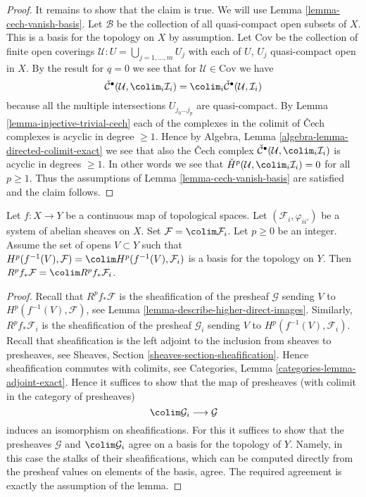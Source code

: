 \begin{proof}
\medskip\noindent
It remains to show that the claim is true. We will use
Lemma \ref{lemma-cech-vanish-basis}.
Let $\mathcal{B}$ be the collection of all quasi-compact open
subsets of $X$. This is a basis for the topology on $X$ by assumption.
Let $\text{Cov}$ be the collection of finite open coverings
$\mathcal{U} : U = \bigcup_{j = 1, \ldots, m} U_j$ with each
of $U$, $U_j$ quasi-compact open in $X$. By the result for $q = 0$
we see that for $\mathcal{U} \in \text{Cov}$ we have
$$
\check{\mathcal{C}}^\bullet(\mathcal{U}, \colim_i \mathcal{I}_i)
=
\colim_i \check{\mathcal{C}}^\bullet(\mathcal{U}, \mathcal{I}_i)
$$
because all the multiple intersections $U_{j_0 \ldots j_p}$
are quasi-compact. By Lemma \ref{lemma-injective-trivial-cech}
each of the complexes in the colimit of {\v C}ech complexes is
acyclic in degree $\geq 1$. Hence by
Algebra, Lemma \ref{algebra-lemma-directed-colimit-exact}
we see that also the {\v C}ech complex
$\check{\mathcal{C}}^\bullet(\mathcal{U}, \colim_i \mathcal{I}_i)$
is acyclic in degrees $\geq 1$. In other words we see that
$\check{H}^p(\mathcal{U},  \colim_i \mathcal{I}_i) = 0$
for all $p \geq 1$. Thus the assumptions of
Lemma \ref{lemma-cech-vanish-basis} are satisfied and the claim follows.
\end{proof}

\begin{lemma}
\label{lemma-higher-direct-image-colimit}
Let $f : X \to Y$ be a continuous map of topological spaces.
Let $(\mathcal{F}_i, \varphi_{ii'})$ be a system of
abelian sheaves on $X$. Set $\mathcal{F} = \colim \mathcal{F}_i$.
Let $p \geq 0$ be an integer. Assume the set of opens $V \subset Y$ such that
$H^p(f^{-1}(V), \mathcal{F}) = \colim H^p(f^{-1}(V), \mathcal{F}_i)$
is a basis for the topology on $Y$. Then
$R^pf_*\mathcal{F} = \colim R^pf_*\mathcal{F}_i$.
\end{lemma}

\begin{proof}
Recall that $R^pf_*\mathcal{F}$ is the sheafification of the presheaf
$\mathcal{G}$ sending $V$ to $H^p(f^{-1}(V), \mathcal{F})$, see
Lemma \ref{lemma-describe-higher-direct-images}. Similarly, 
$R^pf_*\mathcal{F}_i$ is the sheafification of the presheaf
$\mathcal{G}_i$ sending $V$ to $H^p(f^{-1}(V), \mathcal{F}_i)$.
Recall that sheafification is the left adjoint to the inclusion
from sheaves to presheaves, see Sheaves, Section
\ref{sheaves-section-sheafification}. Hence sheafification commutes
with colimits, see Categories, Lemma \ref{categories-lemma-adjoint-exact}.
Hence it suffices to show that the map of presheaves (with colimit
in the category of presheaves)
$$
\colim \mathcal{G}_i \longrightarrow \mathcal{G}
$$
induces an isomorphism on sheafifications. For this it suffices to show
that the presheaves $\mathcal{G}$ and $\colim \mathcal{G}_i$
agree on a basis for the topology of $Y$. Namely, in this case the stalks
of their sheafifications, which can be computed directly from the
presheaf values on elements of the basis, agree.
The required agreement is exactly the assumption of the lemma.
\end{proof}

